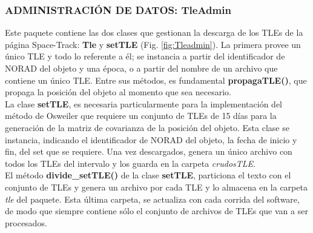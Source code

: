 \subsubsection*{ADMINISTRACI\'ON DE DATOS: TleAdmin}
Este paquete contiene las dos clases que gestionan la descarga de los TLEs de la p\'agina Space-Track: {\bf{Tle}} y {\bf{setTLE}} (Fig. \ref{fig:Tleadmin}). La primera provee un \'unico TLE y todo lo referente a \'el; se instancia a partir del identificador de NORAD del objeto y una \'epoca, o a partir del nombre de un archivo que contiene un \'unico TLE. Entre sus m\'etodos, es fundamental {\bf{propagaTLE()}}, que propaga la posici\'on del objeto al momento que sea necesario.\\

La clase {\bf{setTLE}}, es necesaria particularmente para la implementaci\'on del m\'etodo de Osweiler que requiere un conjunto de TLEs de 15 d\'ias para la generaci\'on de la matriz de covarianza de la posici\'on del objeto. Esta clase se instancia, indicando el identificador de NORAD del objeto, la fecha de inicio y fin, del set que se requiere. Una vez descargados, genera un \'unico archivo con todos los TLEs del intervalo y los guarda en la carpeta {\it{crudosTLE}}.\\

El m\'etodo {\bf{divide\_setTLE()}} de la clase {\bf{setTLE}}, particiona el texto con el conjunto de TLEs y genera un archivo por cada TLE y lo almacena en la carpeta {\it{tle}} del paquete.
Esta \'ultima carpeta, se actualiza con cada corrida del software, de modo que siempre contiene s\'olo el conjunto de archivos de TLEs que van a ser procesados.\\

